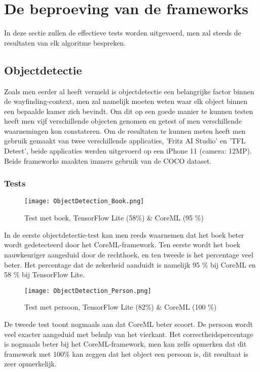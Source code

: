 \section{De beproeving van de frameworks}
In deze sectie zullen de effectieve tests worden uitgevoerd, men zal steeds de resultaten van elk algoritme bespreken.

\subsection{Objectdetectie}

Zoals men eerder al heeft vermeld is objectdetectie een belangrijke factor binnen de wayfinding-context, men zal namelijk moeten weten waar elk object binnen een bepaalde kamer zich bevindt. Om dit op een goede manier te kunnen testen heeft men vijf verschillende objecten genomen en getest of men verschillende waarnemingen kon constateren. Om de resultaten te kunnen meten heeft men gebruik gemaakt van twee verschillende applicaties, 'Fritz AI Studio' en 'TFL Detect', beide applicaties werden uitgevoerd op een iPhone 11 (camera: 12MP). Beide frameworks maakten immers gebruik van de COCO dataset.


\subsubsection{Tests}
	\begin{figure}[H]
		\centering
		\texttt{[image: ObjectDetection\_Book.png]}
		\caption{Test met boek, TensorFlow Lite (58\%) \& CoreML (95 \%)}
	\end{figure}
In de eerste objectdetectie-test kan men reeds waarnemen dat het boek beter wordt gedetecteerd door het CoreML-framework. Ten eerste wordt het boek nauwkeuriger aangeduid door de rechthoek, en ten tweede is het percentage veel beter. Het percentage dat de zekerheid aanduidt is namelijk 95 \% bij CoreML en 58 \% bij TensorFlow Lite.

\begin{figure}[H]
	\centering
	\texttt{[image: ObjectDetection\_Person.png]}
	\caption{Test met persoon, TensorFlow Lite (82\%) \& CoreML (100 \%)}
\end{figure}
De tweede test toont nogmaals aan dat CoreML beter scoort. De persoon wordt veel exacter aangeduid met behulp van het vierkant. Het correctheidspercentage is nogmaals beter bij het CoreML-framework, men kan zelfs opmerken dat dit framework met 100\% kan zeggen dat het object een persoon is, dit resultaat is zeer opmerkelijk.

